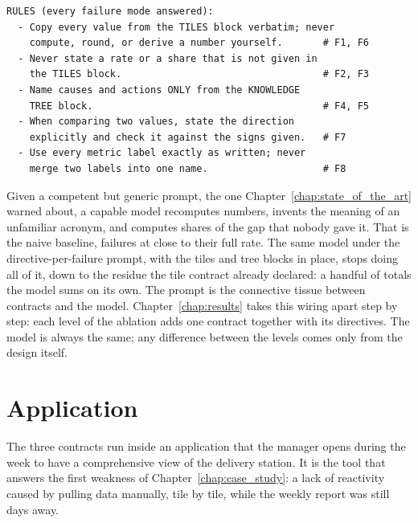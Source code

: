 \documentclass[12pt,a4paper,openright,twoside]{book}
\begin{document}
\begin{lstlisting}[caption={Excerpt of the directive block: every observed failure mode answered by a rule.}, label={lst:directives}]
  RULES (every failure mode answered):
  - Copy every value from the TILES block verbatim; never
    compute, round, or derive a number yourself.       # F1, F6
  - Never state a rate or a share that is not given in
    the TILES block.                                   # F2, F3
  - Name causes and actions ONLY from the KNOWLEDGE
    TREE block.                                        # F4, F5
  - When comparing two values, state the direction
    explicitly and check it against the signs given.   # F7
  - Use every metric label exactly as written; never
    merge two labels into one name.                    # F8
\end{lstlisting}

Given a competent but generic prompt, the one Chapter~\ref{chap:state_of_the_art} warned about, a capable model recomputes numbers, invents the meaning of an unfamiliar acronym, and computes shares of the gap that nobody gave it.
That is the naive baseline, failures at close to their full rate.
The same model under the directive-per-failure prompt, with the tiles and tree blocks in place, stops doing all of it, down to the residue the tile contract already declared: a handful of totals the model sums on its own.
The prompt is the connective tissue between contracts and the model.
Chapter~\ref{chap:results} takes this wiring apart step by step: each level of the ablation adds one contract together with its directives.
The model is always the same; any difference between the levels comes only from the design itself.





\section{Application}
\label{sec:application}

The three contracts run inside an application that the manager opens during the week to have a comprehensive view of the delivery station.
It is the tool that answers the first weakness of Chapter~\ref{chap:case_study}: a lack of reactivity caused by pulling data manually, tile by tile, while the weekly report was still days away. 
\end{document}
